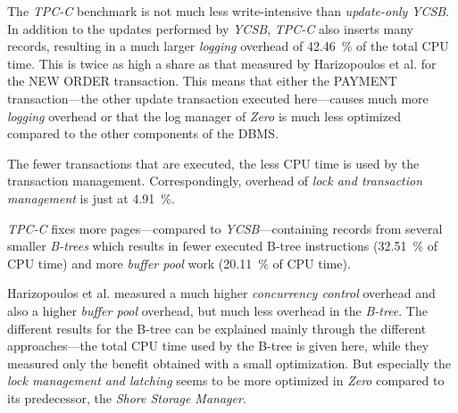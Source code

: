     The \textit{TPC-C} benchmark is not much less write-intensive than \emph{update-only} \textit{YCSB}. In addition to the updates performed by \textit{YCSB}, \textit{TPC-C} also inserts many records, resulting in a much larger \emph{logging} overhead of \SI{42.46}{\percent} of the total CPU time. This is twice as high a share as that measured by Harizopoulos et al. for the NEW ORDER transaction. This means that either the PAYMENT transaction---the other update transaction executed here---causes much more \emph{logging} overhead or that the log manager of \textit{Zero} is much less optimized compared to the other components of the DBMS.

    The fewer transactions that are executed, the less CPU time is used by the transaction management. Correspondingly, overhead of \emph{lock and transaction management} is just at \SI{4.91}{\percent}.

    \textit{TPC-C} fixes more pages---compared to \textit{YCSB}---containing records from several smaller \emph{B-trees} which results in fewer executed B-tree instructions (\SI{32.51}{\percent} of CPU time) and more \emph{buffer pool} work (\SI{20.11}{\percent} of CPU time).

    Harizopoulos et al. measured a much higher \emph{concurrency control} overhead and also a higher \emph{buffer pool} overhead, but much less overhead in the \emph{B-tree}. The different results for the B-tree can be explained mainly through the different approaches---the total CPU time used by the B-tree is given here, while they measured only the benefit obtained with a small optimization. But especially the \emph{lock management and latching} seems to be more optimized in \textit{Zero} compared to its predecessor, the \textit{Shore Storage Manager}.

